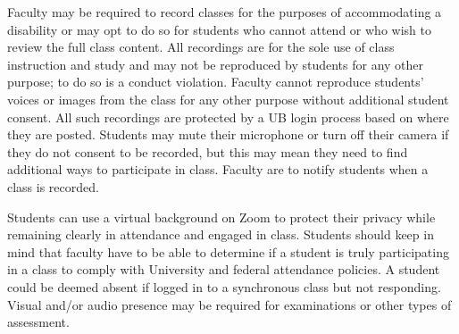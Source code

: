 \documentclass[10pt]{article}
\begin{document}
Faculty may be required to record classes for the purposes of accommodating a disability or may opt to do so for students who cannot attend or who wish to review the full class content. All recordings are for the sole use of class instruction and study and may not be reproduced by students for any other purpose; to do so is a conduct violation. Faculty cannot reproduce students' voices or images from the class for any other purpose without additional student consent. All such recordings are protected by a UB login process based on where they are posted. Students may mute their microphone or turn off their camera if they do not consent to be recorded, but this may mean they need to find additional ways to participate in class. Faculty are to notify students when a class is recorded.

Students can use a virtual background on Zoom to protect their privacy while remaining clearly in attendance and engaged in class. Students should keep in mind that faculty have to be able to determine if a student is truly participating in a class to comply with University and federal attendance policies. A student could be deemed absent if logged in to a synchronous class but not responding. Visual and/or audio presence may be required for examinations or other types of assessment.
\end{document}
